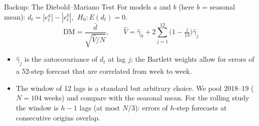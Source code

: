 \documentclass[aspectratio=169,11pt]{beamer}
\begin{document}
\begin{frame}{Backup: The Diebold--Mariano Test}
  \small
  For models $a$ and $b$ (here $b$ = seasonal mean): $d_t=|e^a_t|-|e^b_t|$, $\ H_0:E(d_t)=0$.
  \[ \mathrm{DM}=\frac{\bar d}{\sqrt{\widehat V/N}},\qquad \widehat V=\hat\gamma_0+2\sum_{j=1}^{12}\Big(1-\tfrac{j}{13}\Big)\hat\gamma_j \]
  \begin{itemize}
    \item $\hat\gamma_j$ is the autocovariance of $d_t$ at lag $j$; the Bartlett weights allow for errors of a 52-step forecast that are correlated from week to week.
    \item The window of 12 lags is a standard but arbitrary choice. We pool 2018--19 ($N=104$ weeks) and compare with the seasonal mean. For the rolling study the window is $h-1$ lags (at most $N/3$): errors of $h$-step forecasts at consecutive origins overlap.
  \end{itemize}
\end{frame}
\end{document}
